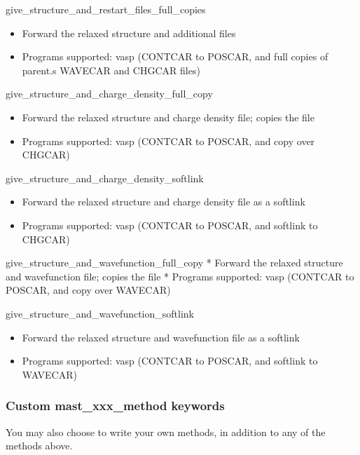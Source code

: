 \documentclass[letterpaper,10pt,english]{sphinxmanual}
\begin{document}
give\_structure\_and\_restart\_files\_full\_copies
\begin{itemize}
\item {} 
Forward the relaxed structure and additional files

\item {} 
Programs supported: vasp (CONTCAR to POSCAR, and full copies of parent.s WAVECAR and CHGCAR files)

\end{itemize}

give\_structure\_and\_charge\_density\_full\_copy
\begin{itemize}
\item {} 
Forward the relaxed structure and charge density file; copies the file

\item {} 
Programs supported: vasp (CONTCAR to POSCAR, and copy over CHGCAR)

\end{itemize}

give\_structure\_and\_charge\_density\_softlink
\begin{itemize}
\item {} 
Forward the relaxed structure and charge density file as a softlink

\item {} 
Programs supported: vasp (CONTCAR to POSCAR, and softlink to CHGCAR)

\end{itemize}

give\_structure\_and\_wavefunction\_full\_copy
*  Forward the relaxed structure and wavefunction file; copies the file
*  Programs supported: vasp (CONTCAR to POSCAR, and copy over WAVECAR)

give\_structure\_and\_wavefunction\_softlink
\begin{itemize}
\item {} 
Forward the relaxed structure and wavefunction file as a softlink

\item {} 
Programs supported: vasp (CONTCAR to POSCAR, and softlink to WAVECAR)

\end{itemize}


\subsubsection{Custom mast\_xxx\_method keywords}
\label{3_0_inputfile:custom-mast-xxx-method-keywords}
You may also choose to write your own methods, in addition to any of the methods above.
\end{document}
